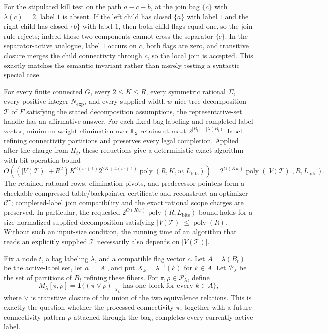 For the stipulated kill test on the path \(a-c-b\), at the join bag \(\{c\}\) with \(\lambda(c)=2\), label \(1\) is absent.  If the left child has closed \(\{a\}\) with label \(1\) and the right child has closed \(\{b\}\) with label \(1\), then both child flags equal one, so the join rule rejects; indeed those two components cannot cross the separator \(\{c\}\).  In the separator-active analogue, label \(1\) occurs on \(c\), both flags are zero, and transitive closure merges the child connectivity through \(c\), so the local join is accepted.  This exactly matches the semantic invariant rather than merely testing a syntactic special case.

For every finite connected \(G\), every \(2\le K\le R\), every symmetric rational \(\Sigma\), every positive integer \(N_{\exp}\), and every supplied width-\(w\) nice tree decomposition \(\mathcal T\) of \(F\) satisfying the stated decomposition assumptions, the representative-set handle has an affirmative answer.  For each fixed bag labeling and completed-label vector, minimum-weight elimination over \(\mathbb F_2\) retains at most \(2^{|B_t|-|\lambda(B_t)|}\) label-refining connectivity partitions and preserves every legal completion.  Applied after the charge from \(H_t\), these reductions give a deterministic exact algorithm with bit-operation bound
\[
 O\!\left((|V(\mathcal T)|+R^2)
 K^{2(w+1)}2^{2K+4(w+1)}
 \operatorname{poly}(R,K,w,L_{\mathrm{bits}})\right)
 =2^{O(Kw)}\operatorname{poly}(|V(\mathcal T)|,R,L_{\mathrm{bits}}).
\]
The retained rational rows, elimination pivots, and predecessor pointers form a checkable compressed table/backpointer certificate and reconstruct an optimizer \(\mathcal C^\star\); completed-label join compatibility and the exact rational scope charges are preserved.
In particular, the requested \(2^{O(Kw)}\operatorname{poly}(R,L_{\mathrm{bits}})\) bound holds for a size-normalized supplied decomposition satisfying \(|V(\mathcal T)|\le\operatorname{poly}(R)\).  Without such an input-size condition, the running time of an algorithm that reads an explicitly supplied \(\mathcal T\) necessarily also depends on \(|V(\mathcal T)|\).

Fix a node \(t\), a bag labeling \(\lambda\), and a compatible flag vector \(c\).  Let \(A=\lambda(B_t)\) be the active-label set, let \(a=|A|\), and put \(X_k=\lambda^{-1}(k)\) for \(k\in A\).  Let \(\mathscr P_\lambda\) be the set of partitions of \(B_t\) refining these fibers.  For \(\pi,\rho\in\mathscr P_\lambda\), define
\[
 M_\lambda[\pi,\rho]
 =\mathbf 1\bigl\{(\pi\vee\rho)|_{X_k}
       \text{ has one block for every }k\in A\bigr\},
\tag{3}
\]
where \(\vee\) is transitive closure of the union of the two equivalence relations.  This is exactly the question whether the processed connectivity \(\pi\), together with a future connectivity pattern \(\rho\) attached through the bag, completes every currently active label.

